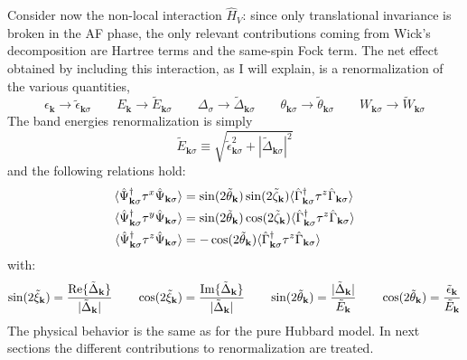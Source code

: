 Consider now the non-local interaction $\hat H_V$: since only translational invariance is broken in the AF phase, the only relevant contributions coming from Wick's decomposition are Hartree terms and the same-spin Fock term. The net effect obtained by including this interaction, as I will explain, is a renormalization of the various quantities,
\[
	\epsilon_\mathbf{k} \to \tilde{\epsilon}_{\mathbf{k}\sigma}
	\qquad
	E_\mathbf{k} \to \tilde{E}_{\mathbf{k}\sigma}
	\qquad
	\Delta_\sigma \to \tilde{\Delta}_{\mathbf{k}\sigma}
	\qquad
	\theta_{\mathbf{k}\sigma} \to \tilde{\theta}_{\mathbf{k}\sigma}
	\qquad
	W_{\mathbf{k}\sigma} \to \tilde{W}_{\mathbf{k}\sigma}
\]
The band energies renormalization is simply
\[
	\tilde{E}_{\mathbf{k}\sigma} \equiv \sqrt{\tilde{\epsilon}_{\mathbf{k}\sigma}^2 + |\tilde{\Delta}_{\mathbf{k}\sigma}|^2}
\]
and the following relations hold:
\begin{align}
	\langle \hat \Psi_{\mathbf{k}\sigma}^\dagger \tau^x \hat \Psi_{\mathbf{k}\sigma} \rangle &= \sin \normalfont(2\tilde{\theta}_\mathbf{k}) \sin \normalfont(2\tilde{\zeta}_\mathbf{k}) \langle \hat \Gamma_{\mathbf{k}\sigma}^\dagger \tau^z \hat \Gamma_{\mathbf{k}\sigma} \rangle \label{eq:af-x-expectation-non-local}\\
	\langle \hat \Psi_{\mathbf{k}\sigma}^\dagger \tau^y \hat \Psi_{\mathbf{k}\sigma} \rangle &= \sin \normalfont(2\tilde{\theta}_\mathbf{k}) \cos \normalfont(2\tilde{\zeta}_\mathbf{k}) \langle \hat \Gamma_{\mathbf{k}\sigma}^\dagger \tau^z \hat \Gamma_{\mathbf{k}\sigma} \rangle \label{eq:af-y-expectation-non-local}\\
	\langle \hat \Psi_{\mathbf{k}\sigma}^\dagger \tau^z \hat \Psi_{\mathbf{k}\sigma} \rangle &= -\cos \normalfont(2\tilde{\theta}_\mathbf{k}) \langle \hat \Gamma_{\mathbf{k}\sigma}^\dagger \tau^z \hat \Gamma_{\mathbf{k}\sigma} \rangle \label{eq:af-z-expectation-non-local}
\end{align}
with:
\begin{equation}\label{eq:af-bogoliubov-angle-relations}
	\sin \normalfont(2\tilde{\xi}_\mathbf{k}) = \frac{\Re\{\tilde{\Delta}_\mathbf{k}\}}{|\tilde{\Delta}_\mathbf{k}|}
	\qquad
	\cos \normalfont(2\tilde{\xi}_\mathbf{k}) = \frac{\Im\{\tilde{\Delta}_\mathbf{k}\}}{|\tilde{\Delta}_\mathbf{k}|}
	\qquad
	\sin \normalfont(2\tilde{\theta}_\mathbf{k}) = \frac{|\tilde{\Delta}_\mathbf{k}|}{\tilde{E}_\mathbf{k}}
	\qquad
	\cos \normalfont(2\tilde{\theta}_\mathbf{k}) = \frac{\tilde{\epsilon}_\mathbf{k}}{\tilde{E}_\mathbf{k}}
\end{equation}
The physical behavior is the same as for the pure Hubbard model. In next sections the different contributions to renormalization are treated.

